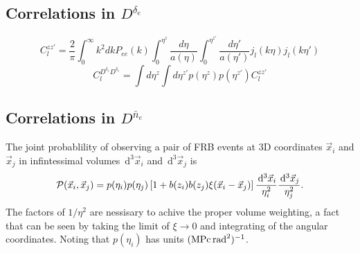 \documentclass[onecolumn,prd,noshowpacs,nofootinbib,amsmath,amssymb]{revtex4}
\newcommand{\ud}{\,\mathrm{d}}
\newcommand{\Dne}{D^{\bar{n}_e}}
\newcommand{\Dde}{D^{\delta_e}}
\newcommand{\calP}{{\cal P}}
\begin{document}
\subsection{Correlations in $\Dde$}

\begin{equation}
C_l^{zz'}=\frac{2}{\pi} \int_0^{\infty}k^2 dk P_{ee}(k) \int_0^{\eta^z}\frac{d\eta}{a(\eta)} \int_0^{\eta^{z'}}\frac{d\eta'}{a(\eta')}  j_l(k\eta) j_l(k\eta')
\end{equation}
\begin{equation}
C_l^{\Dde \Dde} = \int d\eta^z \int d\eta^{z'} p(\eta^z)p(\eta^{z'}) C_l^{z z'}
\end{equation}


\subsection{Correlations in $\Dne$}

The joint probablility of observing a pair of FRB events at 3D coordinates
$\vec x_i$ and $\vec x_j$ in infintessimal volumes $\ud^3\vec x_i$ and
$\ud^3\vec x_j$ is
\begin{equation}
    \calP(\vec x_i, \vec x_j) = p(\eta_i) p(\eta_j) \left[ 1 + b(z_i)
    b(z_j) \xi(\vec x_i - \vec x_j) \right] \frac{\ud^3\vec x_i}{\eta_i^2}
    \frac{\ud^3\vec x_j}{\eta_j^2}.
\end{equation}
The factors of $1/\eta^2$ are nessisary to achive the proper volume weighting,
a fact that can be seen by taking the limit of $\xi \to 0$ and integrating of
the angular coordinates. Noting that $p(\eta_i)$ has units 
$({\rm MPc}\,{\rm rad}^2)^{-1}$.
\end{document}
